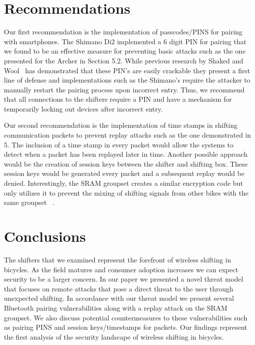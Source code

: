 \documentclass[letterpaper,twocolumn,10pt]{article}
\begin{document}
\section{Recommendations}

Our first recommendation is the implementation of passcodes/PINS for pairing with smartphones. The Shimano Di2 implemented a 6 digit PIN for pairing that we found to be an effective measure for preventing basic attacks such as the one presented for the Archer in Section 5.2. While previous research by Shaked and Wool~ \cite{bluepin} has demonstrated that these PIN’s are easily crackable they present a first line of defense and implementations such as the Shimano’s require the attacker to manually restart the pairing process upon incorrect entry. Thus, we recommend that all connections to the shifters require a PIN and have a mechanism for temporarily locking out devices after incorrect entry.

Our second recommendation is the implementation of time stamps in shifting communication packets to prevent replay attacks such as the one demonstrated in 5. The inclusion of a time stamp in every packet would allow the systems to detect when a packet has been replayed later in time. Another possible approach would be the creation of session keys between the shifter and shifting box. These session keys would be generated every packet and a subsequent replay would be denied. Interestingly, the SRAM groupset creates a similar encryption code but only utilizes it to prevent the mixing of shifting signals from other bikes with the same groupset~ \cite{etapsecure}.


\section{Conclusions}

The shifters that we examined represent the forefront of wireless shifting in bicycles. As the field matures and consumer adoption increases we can expect security to be a larger concern.
In our paper we presented a novel threat model that focuses on remote attacks that pose a direct threat to the user through unexpected shifting. In accordance with our threat model we present several Bluetooth pairing vulnerabilities along with a replay attack on the SRAM groupset. We also discuss potential countermeasures to these vulnerabilities such as pairing PINS and session keys/timestamps for packets. Our findings represent the first analysis of the security landscape of wireless shifting in bicycles.
\end{document}

